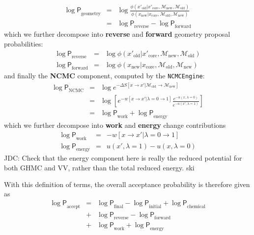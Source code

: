 \documentclass[aps,pre,twocolumn,nofootinbib,superscriptaddress,linenumbers,11point]{revtex4-1}
\newcommand{\logP}{{\log \mathsf{P}}}
\begin{document}
\begin{itemize}
\begin{eqnarray}
\logP_\mathrm{geometry} &=& \log \frac{\phi(x'_\mathrm{old} | x'_\mathrm{core}, \mathcal{M}_\mathrm{new}, \mathcal{M}_\mathrm{old})}{\phi(x_\mathrm{new} | x_\mathrm{core}, \mathcal{M}_\mathrm{old}, \mathcal{M}_\mathrm{new})} \label{equation:hybrid-geometry} \\
&=& \logP_\mathrm{reverse} - \logP_\mathrm{forward}
\end{eqnarray}
which we further decompose into {\bf reverse} and {\bf forward} geometry proposal probabilities:
\begin{eqnarray}
\logP_\mathrm{reverse} &=& \log \phi(x'_\mathrm{old} | x'_\mathrm{core}, \mathcal{M}_\mathrm{new}, \mathcal{M}_\mathrm{old}) \\
\logP_\mathrm{forward} &=& \log \phi(x_\mathrm{new} | x_\mathrm{core}, \mathcal{M}_\mathrm{old}, \mathcal{M}_\mathrm{new})
\end{eqnarray}
and finally the {\bf NCMC} component, computed by the {\tt NCMCEngine}:
\begin{eqnarray}
\logP_\mathrm{NCMC} &=& \log e^{-\Delta S[x \rightarrow x' | \mathcal{M}_\mathrm{old} \rightarrow \mathcal{M}_\mathrm{new}]}  \label{equation:hybrid-ncmc} \\
&=& \log \left[ e^{-w[x \rightarrow x' | \lambda = 0 \rightarrow 1]} \frac{e^{-u(x, \lambda=0)}}{e^{-u(x', \lambda=1)}} \right] \\
&=& \logP_\mathrm{work} + \logP_\mathrm{energy}
\end{eqnarray}
which we further decompose into {\bf work} and {\bf energy} change contributions
\begin{eqnarray}
\logP_\mathrm{work} &=& -w[x \rightarrow x' | \lambda = 0 \rightarrow 1] \\
\logP_\mathrm{energy} &=& u(x', \lambda=1) - u(x, \lambda=0)
\end{eqnarray}
{\color{red} JDC: Check that the energy component here is really the reduced potential for both GHMC and VV, rather than the total reduced energy.}
ski
\end{itemize}
With this definition of terms, the overall acceptance probability is therefore given as
\begin{eqnarray}
\logP_\mathrm{accept} &=& \logP_\mathrm{final} - \logP_\mathrm{initial} + \logP_\mathrm{chemical} \nonumber \\
&+& \logP_\mathrm{reverse} - \logP_\mathrm{forward} \nonumber \\
&+& \logP_\mathrm{work} + \logP_\mathrm{energy}
\end{eqnarray}
\end{document}
